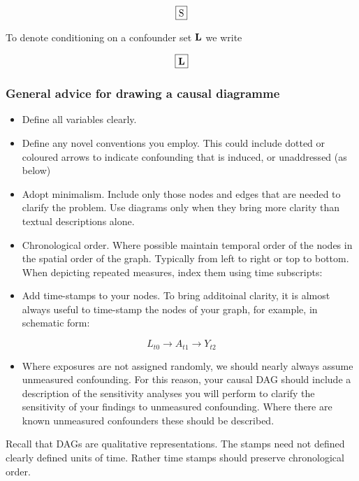 \documentclass[
  singlecolumn]{report}
\providecommand{\tightlist}{%
  \setlength{\itemsep}{0pt}\setlength{\parskip}{0pt}}\usepackage{longtable,booktabs,array}
\begin{document}
\[\framebox{S}\]

To denote conditioning on a confounder set \(\bf{L}\) we write

\[\framebox{{\bf L}}\]

\hypertarget{general-advice-for-drawing-a-causal-diagramme}{%
\subsubsection{General advice for drawing a causal
diagramme}\label{general-advice-for-drawing-a-causal-diagramme}}

\begin{itemize}
\item
  Define all variables clearly.
\item
  Define any novel conventions you employ. This could include dotted or
  coloured arrows to indicate confounding that is induced, or
  unaddressed (as below)
\item
  Adopt minimalism. Include only those nodes and edges that are needed
  to clarify the problem. Use diagrams only when they bring more clarity
  than textual descriptions alone.
\item
  Chronological order. Where possible maintain temporal order of the
  nodes in the spatial order of the graph. Typically from left to right
  or top to bottom. When depicting repeated measures, index them using
  time subscripts:
\item
  Add time-stamps to your nodes. To bring additoinal clarity, it is
  almost always useful to time-stamp the nodes of your graph, for
  example, in schematic form:
\end{itemize}

\[
L_{t0} \rightarrow A_{t1} \rightarrow Y_{t2}
\]

\begin{itemize}
\tightlist
\item
  Where exposures are not assigned randomly, we should nearly always
  assume unmeasured confounding. For this reason, your causal DAG should
  include a description of the sensitivity analyses you will perform to
  clarify the sensitivity of your findings to unmeasured confounding.
  Where there are known unmeasured confounders these should be
  described.
\end{itemize}

Recall that DAGs are qualitative representations. The stamps need not
defined clearly defined units of time. Rather time stamps should
preserve chronological order.
\end{document}
